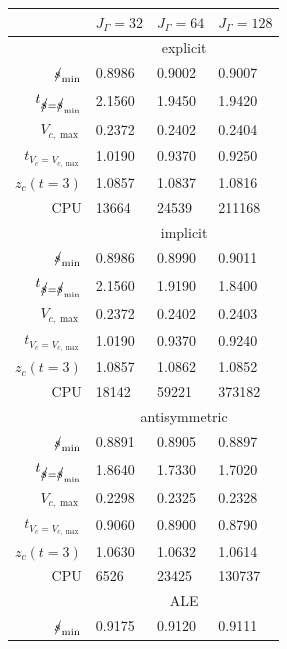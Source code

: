 \begin{table}
\center
\hspace*{-3.25cm}
\begin{tabular}{rlll}
\hline
 & $J_\Gamma=32$ & $J_\Gamma=64$ & $J_\Gamma=128$ \\
\hline
& \multicolumn{3}{c}{explicit} \\
\cmidrule{2-4}
$\mbox{$s\!\!\!\!\:/$}_{\min}$                & 0.8986 & 0.9002 & 0.9007 \\
$t_{\strikes = \strikes_{\min}}$ & 2.1560 & 1.9450 & 1.9420 \\
$V_{c,\max}$                     & 0.2372 & 0.2402 & 0.2404 \\
$t_{V_c = V_{c,\max}}$           & 1.0190 & 0.9370 & 0.9250 \\
$z_c(t=3)$                       & 1.0857 & 1.0837 & 1.0816 \\
CPU                              &  13664 &  24539 & 211168 \\
\cmidrule{2-4}
& \multicolumn{3}{c}{implicit} \\
\cmidrule{2-4}
$\mbox{$s\!\!\!\!\:/$}_{\min}$                & 0.8986 & 0.8990 & 0.9011 \\
$t_{\strikes = \strikes_{\min}}$ & 2.1560 & 1.9190 & 1.8400 \\
$V_{c,\max}$                     & 0.2372 & 0.2402 & 0.2403 \\
$t_{V_c = V_{c,\max}}$           & 1.0190 & 0.9370 & 0.9240 \\
$z_c(t=3)$                       & 1.0857 & 1.0862 & 1.0852 \\
CPU                              &  18142 &  59221 & 373182 \\
\cmidrule{2-4}
& \multicolumn{3}{c}{antisymmetric} \\
\cmidrule{2-4}
$\mbox{$s\!\!\!\!\:/$}_{\min}$                & 0.8891 & 0.8905 & 0.8897 \\
$t_{\strikes = \strikes_{\min}}$ & 1.8640 & 1.7330 & 1.7020 \\
$V_{c,\max}$                     & 0.2298 & 0.2325 & 0.2328 \\
$t_{V_c = V_{c,\max}}$           & 0.9060 & 0.8900 & 0.8790 \\
$z_c(t=3)$                       & 1.0630 & 1.0632 & 1.0614 \\
CPU                              &   6526 &  23425 & 130737 \\
\cmidrule{2-4}
& \multicolumn{3}{c}{ALE} \\
\cmidrule{2-4}
$\mbox{$s\!\!\!\!\:/$}_{\min}$                & 0.9175 & 0.9120 & 0.9111 \\

\end{tabular}
\end{table}
